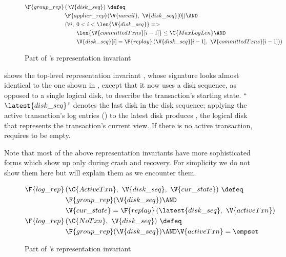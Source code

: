 \begin{figure}[htb]
\centering
\specfont
\begin{equation*}
\begin{aligned}
  \F{group\_rep}\, & (\,\V{disk\_seq})~\defeq \\
  & \F{applier\_rep}(\V{navail},~\V{disk\_seq}[0]) \AND \\
  & (\forall i,\; 0 < i < \len{\V{disk\_seq}} => \\
  & \qquad \len{\V{committedTxns}[i-1]} \leq \C{MaxLogLen} \AND \\
  & \qquad \V{disk\_seq}[i] = 
    \F{replay}\,(\V{disk\_seq}[i-1],~\V{committedTxns}[i-1]))
\end{aligned}
\end{equation*}
\caption{Part of \grouplog's representation invariant}
\label{fig:group_rep}
\end{figure}

 shows the top-level representation invariant
, whose signature looks almost identical to the one shown in
, except that it now uses a disk sequence, as opposed to a
single logical disk, to describe the transaction's starting state.
``$\latest{disk\_seq}$'' denotes the last disk in the disk sequence;
applying the active transaction's log entries () to the latest
disk produces , the logical disk that represents the
transaction's current view.  If there is no active transaction,
 requires  to be empty.

Note that most of the above representation invariants have more
sophisticated forms which show up only during crash and recovery.  For
simplicity we do not show them here but will explain them as we encounter
them.

\begin{figure}[htb]
\centering
\specfont
\begin{equation*}
\begin{aligned}
  \F{log\_rep} \, & (\C{ActiveTxn}, ~\V{disk\_seq}, ~\V{cur\_state})~\defeq \\
  & \F{group\_rep}(\V{disk\_seq}) \AND \\
  & \V{cur\_state} = \F{replay}\,(\latest{disk\_seq}, ~\V{activeTxn})
  &\\
  \F{log\_rep} \, & (\C{NoTxn}, ~\V{disk\_seq})~\defeq \\
  & \F{group\_rep}(\V{disk\_seq}) \AND \V{activeTxn} = \empset
\end{aligned}
\end{equation*}
\caption{Part of \logapi's representation invariant}
\label{fig:log_rep_new}
\end{figure}


